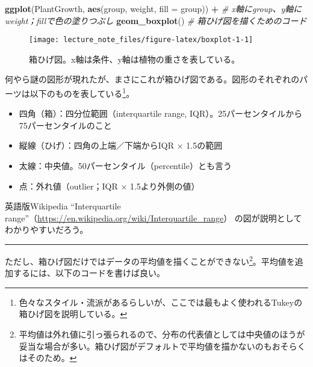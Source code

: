 \documentclass[]{book}
\newenvironment{Shaded}{\begin{snugshade}}{\end{snugshade}}
\newcommand{\KeywordTok}[1]{\textcolor[rgb]{0.13,0.29,0.53}{\textbf{#1}}}
\newcommand{\DataTypeTok}[1]{\textcolor[rgb]{0.13,0.29,0.53}{#1}}
\newcommand{\StringTok}[1]{\textcolor[rgb]{0.31,0.60,0.02}{#1}}
\newcommand{\CommentTok}[1]{\textcolor[rgb]{0.56,0.35,0.01}{\textit{#1}}}
\newcommand{\OperatorTok}[1]{\textcolor[rgb]{0.81,0.36,0.00}{\textbf{#1}}}
\newcommand{\NormalTok}[1]{#1}
\let\rmarkdownfootnote\footnote%
\def\footnote{\protect\rmarkdownfootnote}
\begin{document}
\begin{Shaded}
\begin{Highlighting}[]
\KeywordTok{ggplot}\NormalTok{(PlantGrowth, }\KeywordTok{aes}\NormalTok{(group, weight, }\DataTypeTok{fill =}\NormalTok{ group)) }\OperatorTok{+}\StringTok{ }\CommentTok{# x軸にgroup、y軸にweight；fillで色の塗りつぶし}
\StringTok{  }\KeywordTok{geom_boxplot}\NormalTok{() }\CommentTok{# 箱ひげ図を描くためのコード}
\end{Highlighting}
\end{Shaded}

\begin{figure}

{\centering \texttt{[image: lecture\_note\_files/figure-latex/boxplot-1-1]} 

}

\caption{箱ひげ図。x軸は条件、y軸は植物の重さを表している。}\label{fig:boxplot-1}
\end{figure}

何やら謎の図形が現れたが、まさにこれが箱ひげ図である。図形のそれぞれのパーツは以下のものを表している\footnote{色々なスタイル・流派があるらしいが、ここでは最もよく使われるTukeyの箱ひげ図を説明している。}。

\begin{itemize}
\item
  四角（箱）：四分位範囲（interquartile range,
  IQR）。25パーセンタイルから75パーセンタイルのこと
\item
  縦線（ひげ）：四角の上端／下端からIQR × 1.5の範囲
\item
  太線：中央値。50パーセンタイル（percentile）とも言う
\item
  点：外れ値（outlier；IQR × 1.5より外側の値）
\end{itemize}

英語版Wikipedia ``Interquartile
range''（\url{https://en.wikipedia.org/wiki/Interquartile_range}）
の図が説明としてわかりやすいだろう。

\begin{center}\rule{0.5\linewidth}{\linethickness}\end{center}

ただし、箱ひげ図だけではデータの平均値を描くことができない\footnote{平均値は外れ値に引っ張られるので、分布の代表値としては中央値のほうが妥当な場合が多い。箱ひげ図がデフォルトで平均値を描かないのもおそらくはそのため。}。平均値を追加するには、以下のコードを書けば良い。
\end{document}
